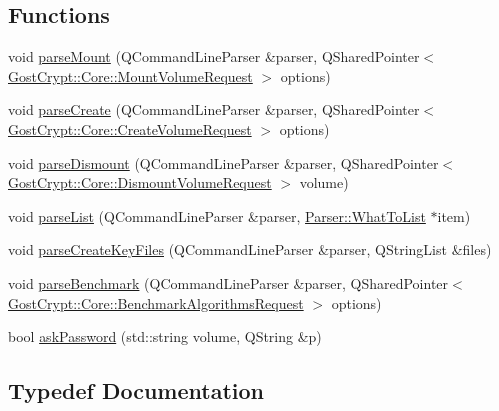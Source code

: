 \subsection*{Functions}
\begin{DoxyCompactItemize}
\item 
void \hyperlink{namespace_parser_ad8395bb69888f527eefafe64ee3db50e}{parse\+Mount} (Q\+Command\+Line\+Parser \&parser, Q\+Shared\+Pointer$<$ \hyperlink{struct_gost_crypt_1_1_core_1_1_mount_volume_request}{Gost\+Crypt\+::\+Core\+::\+Mount\+Volume\+Request} $>$ options)
\item 
void \hyperlink{namespace_parser_aef069760011ee9f2066a254ab84f9b7c}{parse\+Create} (Q\+Command\+Line\+Parser \&parser, Q\+Shared\+Pointer$<$ \hyperlink{struct_gost_crypt_1_1_core_1_1_create_volume_request}{Gost\+Crypt\+::\+Core\+::\+Create\+Volume\+Request} $>$ options)
\item 
void \hyperlink{namespace_parser_ae09396fa6fb2bb95523073e4bdfc4969}{parse\+Dismount} (Q\+Command\+Line\+Parser \&parser, Q\+Shared\+Pointer$<$ \hyperlink{struct_gost_crypt_1_1_core_1_1_dismount_volume_request}{Gost\+Crypt\+::\+Core\+::\+Dismount\+Volume\+Request} $>$ volume)
\item 
void \hyperlink{namespace_parser_aa78b1b9475d7b6183c16d4abd6a2ab0f}{parse\+List} (Q\+Command\+Line\+Parser \&parser, \hyperlink{namespace_parser_a1f62f98026c9b835ba6b9a3210a25b8b}{Parser\+::\+What\+To\+List} $\ast$item)
\item 
void \hyperlink{namespace_parser_a1d19ba15381c47283b17a5ceddf41da5}{parse\+Create\+Key\+Files} (Q\+Command\+Line\+Parser \&parser, Q\+String\+List \&files)
\item 
void \hyperlink{namespace_parser_a8aeeeb21b1d6f07cfe0c69c5b3a9e4a1}{parse\+Benchmark} (Q\+Command\+Line\+Parser \&parser, Q\+Shared\+Pointer$<$ \hyperlink{struct_gost_crypt_1_1_core_1_1_benchmark_algorithms_request}{Gost\+Crypt\+::\+Core\+::\+Benchmark\+Algorithms\+Request} $>$ options)
\item 
bool \hyperlink{namespace_parser_adf13e015ae2b7536868c427360401238}{ask\+Password} (std\+::string volume, Q\+String \&p)
\end{DoxyCompactItemize}


\subsection{Typedef Documentation}
\mbox{\label{namespace_parser_a1f62f98026c9b835ba6b9a3210a25b8b}} 
